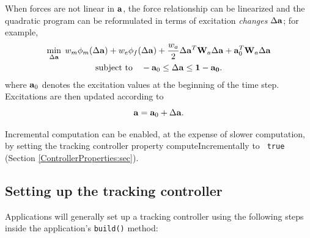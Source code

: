 When forces are not linear in ${\bf a}$, the force relationship can be linearized
and the quadratic program can be reformulated in terms of excitation {\it
changes} $\Delta {\bf a}$; for example,
%
\begin{gather}
\min_{\Delta{\bf a}} \; w_m \phi_m(\Delta{\bf a}) + w_e \phi_f (\Delta{\bf a}) + 
\frac{w_a}{2} \Delta{\bf a}^T {\bf W}_a \Delta{\bf a} + {\bf a}_0^T {\bf W}_a \Delta{\bf a} \notag \\
\text{subject to} \quad -{\bf a}_0 \le \Delta{\bf a} \le {\bf 1-{\bf a}_0}.
\label{incrementalQP:eqn}
\end{gather}
%
where ${\bf a}_0$ denotes the excitation values at the beginning of
the time step. Excitations are then updated
according to 
%
\begin{equation*}
{\bf a} = {\bf a}_0 + \Delta {\bf a}.
\end{equation*}
%

Incremental computation can be enabled, at the expense of slower computation,
by setting the tracking controller property {\sf computeIncrementally} to {\tt
true} (Section \ref{ControllerProperties:sec}).

\subsection{Setting up the tracking controller}
\label{SettingUpController:sec}

Applications will generally set up a tracking controller using the following
steps inside the application's {\tt build()} method:

